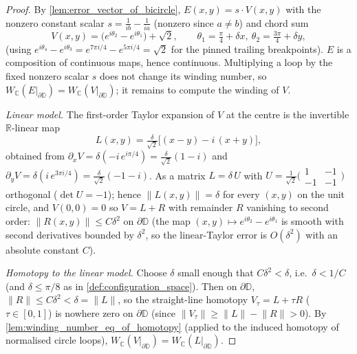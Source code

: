 \begin{proof}
        \leanok
  By \cref{lem:error_vector_of_bicircle}, $E(x,y) = s\cdot V(x,y)$ with the nonzero
  constant scalar $s = \tfrac{1}{ib} - \tfrac{1}{ia}$ (nonzero since $a \ne b$) and
  chord sum
  \[
    V(x,y) = \bigl(e^{i\theta_2} - e^{i\theta_1}\bigr) + \sqrt2,
    \qquad \theta_1 = \tfrac{\pi}{4}+\delta x,\ \theta_2 = \tfrac{3\pi}{4}+\delta y,
  \]
  (using $e^{i\theta_4}-e^{i\theta_3} = e^{7\pi i/4}-e^{5\pi i/4} = \sqrt2$ for the
  pinned trailing breakpoints). $E$ is a composition of continuous maps, hence
  continuous. Multiplying a loop by the fixed nonzero scalar $s$ does not change its
  winding number, so $W_{\mathbb{C}}(E|_{\partial\mathbb{D}}) =
  W_{\mathbb{C}}(V|_{\partial\mathbb{D}})$; it remains to compute the winding of $V$.

  \emph{Linear model.} The first-order Taylor expansion of $V$ at the centre is the
  invertible $\mathbb{R}$-linear map
  \[
    L(x,y) = \tfrac{\delta}{\sqrt2}\bigl[(x-y) - i\,(x+y)\bigr],
  \]
  obtained from $\partial_x V = \delta(-i\,e^{i\pi/4}) = \tfrac{\delta}{\sqrt2}(1-i)$
  and $\partial_y V = \delta(i\,e^{3\pi i/4}) = \tfrac{\delta}{\sqrt2}(-1-i)$. As a
  matrix $L = \delta\,U$ with $U = \tfrac{1}{\sqrt2}\bigl(\begin{smallmatrix} 1 & -1
  \\ -1 & -1\end{smallmatrix}\bigr)$ orthogonal ($\det U = -1$); hence $\lVert
  L(x,y)\rVert =
  \delta$ for every $(x,y)$ on the unit circle, and $V(0,0)=0$ so $V = L + R$ with
  remainder $R$ vanishing to second order: $\lVert R(x,y)\rVert \le C\delta^2$ on
  $\partial\mathbb{D}$ (the map $(x,y) \mapsto e^{i\theta_2}-e^{i\theta_1}$ is smooth
  with second derivatives bounded by $\delta^2$, so the linear-Taylor error is
  $O(\delta^2)$ with an absolute constant $C$).

  \emph{Homotopy to the linear model.} Choose $\delta$ small enough that $C\delta^2
  < \delta$, i.e.\ $\delta < 1/C$ (and $\delta \le \pi/8$ as in
  \cref{def:configuration_space}). Then on $\partial\mathbb{D}$, $\lVert R\rVert \le
  C\delta^2 < \delta = \lVert L\rVert$, so the straight-line homotopy $V_\tau = L +
  \tau R$ ($\tau\in[0,1]$) is nowhere zero on $\partial\mathbb{D}$ (since $\lVert
  V_\tau\rVert \ge \lVert L\rVert - \lVert R\rVert > 0$). By
  \cref{lem:winding_number_eq_of_homotopy} (applied to the induced homotopy of
  normalised circle loops), $W_{\mathbb{C}}(V|_{\partial\mathbb{D}}) =
  W_{\mathbb{C}}(L|_{\partial\mathbb{D}})$.


\end{proof}

